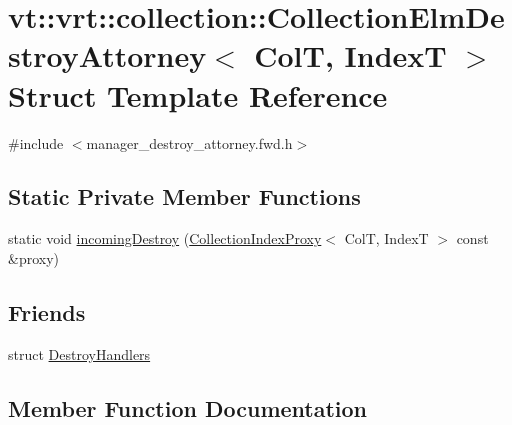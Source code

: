 \hypertarget{structvt_1_1vrt_1_1collection_1_1_collection_elm_destroy_attorney}{}\section{vt\+:\+:vrt\+:\+:collection\+:\+:Collection\+Elm\+Destroy\+Attorney$<$ ColT, IndexT $>$ Struct Template Reference}
\label{structvt_1_1vrt_1_1collection_1_1_collection_elm_destroy_attorney}


{\ttfamily \#include $<$manager\+\_\+destroy\+\_\+attorney.\+fwd.\+h$>$}

\subsection*{Static Private Member Functions}
\begin{DoxyCompactItemize}
\item 
static void \hyperlink{structvt_1_1vrt_1_1collection_1_1_collection_elm_destroy_attorney_ac22585d9503c458cb4f5d7b41d241168}{incoming\+Destroy} (\hyperlink{namespacevt_a2be17f5dafb626fe9f58d762b6aad2f0}{Collection\+Index\+Proxy}$<$ ColT, IndexT $>$ const \&proxy)
\end{DoxyCompactItemize}
\subsection*{Friends}
\begin{DoxyCompactItemize}
\item 
struct \hyperlink{structvt_1_1vrt_1_1collection_1_1_collection_elm_destroy_attorney_ab072692eaf0bed072206c6c8119b79ea}{Destroy\+Handlers}
\end{DoxyCompactItemize}


\subsection{Member Function Documentation}
\mbox{\label{structvt_1_1vrt_1_1collection_1_1_collection_elm_destroy_attorney_ac22585d9503c458cb4f5d7b41d241168}} 
